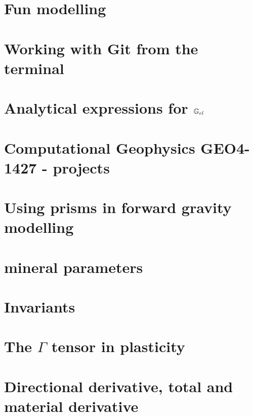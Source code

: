 \documentclass[a4paper,12pt]{report}
\begin{document}
\chapter{Fun modelling}  %
\chapter{Working with Git from the terminal}  %
\chapter{Analytical expressions for ${\mathbb{G}}_{el}$} \label{app:Gel}  %
\chapter{Computational Geophysics GEO4-1427 - projects}  %
\chapter{Using prisms in forward gravity modelling \label{app:prisms}}  %
\chapter{mineral parameters}  %
\chapter{Invariants \label{app:invariants}}  %
\chapter{The $\Gamma$ tensor in plasticity}  %
\chapter{Directional derivative, total and material derivative \label{app:ders}}  %

\printbibliography

\newpage
{}
\end{document}
